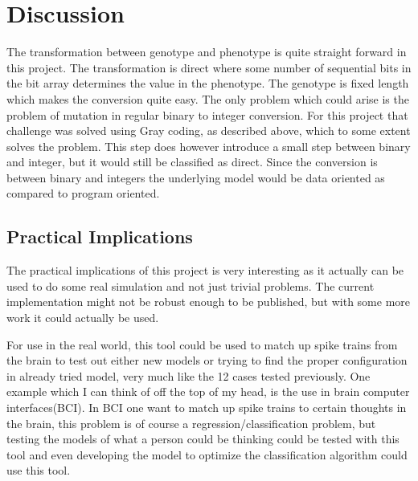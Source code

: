 \section{Discussion}\label{sec:discussion}
The transformation between genotype and phenotype is quite straight forward in
this project. The transformation is direct where some number of sequential bits in the bit
array determines the value in the phenotype. The genotype is fixed length which
makes the conversion quite easy. The only problem which could arise is the
problem of mutation in regular binary to integer conversion. For this project
that challenge was solved using Gray coding, as described above, which to some
extent solves the problem. This step does however introduce a small step between
binary and integer, but it would still be classified as direct. Since the
conversion is between binary and integers the underlying model would be
data oriented as compared to program oriented.

\subsection{Practical Implications}\label{sec:practical-implications}
The practical implications of this project is very interesting as it actually
can be used to do some real simulation and not just trivial problems. The
current implementation might not be robust enough to be published, but with some
more work it could actually be used.

For use in the real world, this tool could be used to match up spike trains from
the brain to test out either new models or trying to find the proper
configuration in already tried model, very much like the 12 cases tested
previously. One example which I can think of off the top of my head, is the use
in brain computer interfaces(BCI). In BCI one want to match up spike trains to
certain thoughts in the brain, this problem is of course a
regression/classification problem, but testing the models of what a person could
be thinking could be tested with this tool and even developing the model to
optimize the classification algorithm could use this tool.

